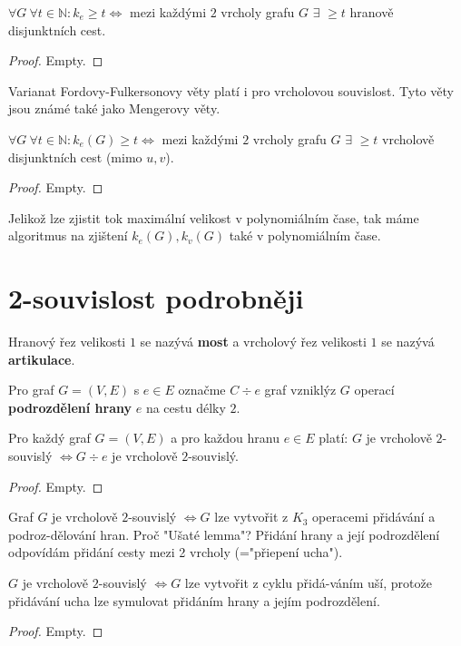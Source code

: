 \begin{veta}
	$\forall G \ \forall t \in \mathbb{N}: k_{e} \geq t \Leftrightarrow$ mezi každými $2$ vrcholy grafu $G$ $\exists$ $\geq t$ hranově disjunktních cest.
\end{veta}

\begin{proof}
	Empty.
\end{proof}

Varianat Fordovy-Fulkersonovy věty platí i pro vrcholovou souvislost. Tyto věty jsou známé také jako Mengerovy věty.

\begin{veta}
	$\forall G \ \forall t \in \mathbb{N}: k_{e}(G) \geq t \Leftrightarrow$ mezi každými $2$ vrcholy grafu $G$ $\exists$ $\geq t$ vrcholově disjunktních cest (mimo $u,v$).
\end{veta}

\begin{proof}
	Empty.
\end{proof}

Jelikož lze zjistit tok maximální velikost v polynomiálním čase, tak máme algoritmus na zjištení $k_{e}(G), k_{v}(G)$ také v polynomiálním čase.

\section{2-souvislost podrobněji}

\begin{definice}
	Hranový řez velikosti $1$ se nazývá \textbf{most} a vrcholový řez velikosti  $1$ se nazývá \textbf{artikulace}.
\end{definice}

Pro graf $G=(V,E)$ s $e \in E$ označme $C \div e$ graf vzniklýz $G$ operací \textbf{podrozdělení hrany} $e$ na cestu délky $2$.

\begin{lemma}
	Pro každý graf $G=(V,E)$ a pro každou hranu $e \in E$ platí: $G$ je vrcholově $2$-souvislý $\Leftrightarrow G \div e$ je vrcholově $2$-souvislý.
\end{lemma}

\begin{proof}
	Empty.
\end{proof}

\begin{veta}
	Graf $G$ je vrcholově $2$-souvislý $\Leftrightarrow G$ lze vytvořit z $K_{3}$ operacemi přidávání a podroz-\newline dělování hran. Proč "Ušaté lemma"? Přidání hrany a její podrozdělení odpovídám přidání cesty mezi 2 vrcholy (="přiepení ucha").
\end{veta}

\begin{veta}
	$G$ je vrcholově $2$-souvislý $\Leftrightarrow G$ lze vytvořit z cyklu přidá-\newline váním uší, protože přidávání ucha lze symulovat přidáním hrany a jejím podrozdělení.
\end{veta}

\begin{proof}
	Empty.
\end{proof}
